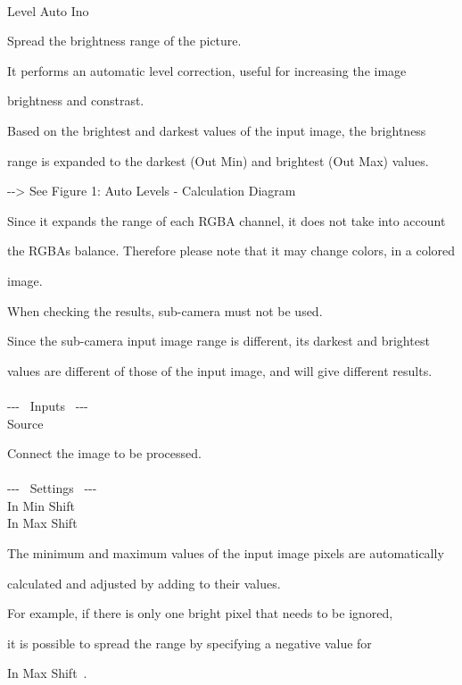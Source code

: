 \documentclass[a4paper,12pt]{article}
\begin{document}
\thispagestyle{empty}

\Large
\noindent \\
Level Auto Ino\medskip
\par
\normalsize
Spread the brightness range of the picture.\\
\par
It performs an automatic level correction, useful for increasing the image\par 
brightness and constrast.\\
\par
Based on the brightest and darkest values of the input image, the brightness\par 
range is expanded to the darkest (Out Min) and brightest (Out Max) values.\par
-{-}> See Figure 1: \textquotedbl Auto Levels - Calculation Diagram\textquotedbl\\
\par
Since it expands the range of each RGBA channel, it does not take into account\par
the RGBA\textquotesingle s balance. Therefore please note that it may change colors, in a colored\par
image.\\
\par
When checking the results, sub-camera must not be used.\par
Since the sub-camera input image range is different, its darkest and brightest\par 
values are different of those of the input image, and will give different results.\\
\\
-{-}- \ Inputs \ -{-}-\\
Source\par
Connect the image to be processed.\\
\\
-{-}- \ Settings \ -{-}-\\
In Min Shift\\
In Max Shift\par
The minimum and maximum values of the input image pixels are automatically\par calculated and adjusted by adding to their values.\par
For example, if there is only one bright pixel that needs to be ignored,\par
it is possible to spread the range by specifying a negative value for\par 
\textquotedbl In Max Shift\textquotedbl \ .\par
\end{document}
